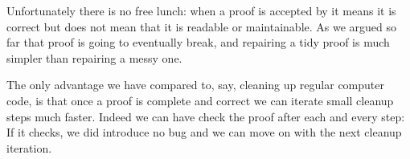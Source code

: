 Unfortunately there is no free lunch: when a proof is accepted by
\Coq{} it means it is correct but does not mean that it is readable or
maintainable. As we argued so far that proof is going to eventually
break, and repairing a tidy proof is much simpler than repairing a
messy one.

The only advantage we have compared to, say, cleaning up regular
computer code, is that once a proof is complete and correct
we can iterate small cleanup steps much faster. Indeed we can have
\Coq{} check the proof after each and every step: If it checks,
we did introduce no bug and we can move on with the next cleanup
iteration.
